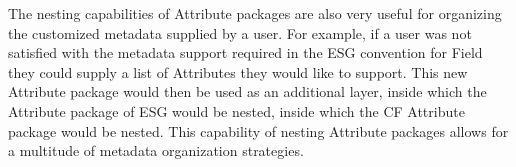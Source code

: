 The nesting capabilities of Attribute packages are also very useful for organizing the customized metadata supplied by a user.  For example, if a user was not satisfied with the metadata support required in the ESG convention for Field they could supply a list of Attributes they would like to support.  This new Attribute package would then be used as an additional layer, inside which the Attribute package of ESG would be nested, inside which the CF Attribute package would be nested.  This capability of nesting Attribute packages allows for a multitude of metadata organization strategies.



